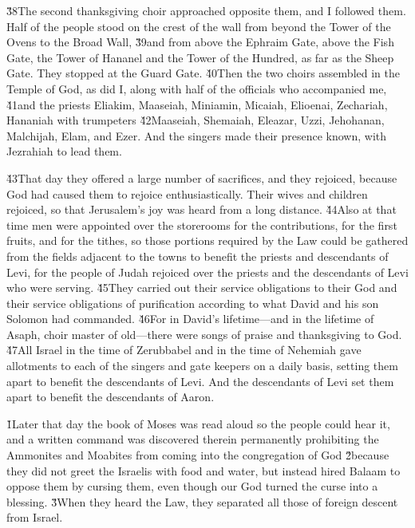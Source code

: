 \v{38}The second thanksgiving choir approached opposite them, and I followed them. Half of the people stood on the crest of the wall from beyond the Tower of the Ovens to the Broad Wall, \v{39}and from above the Ephraim Gate, above the Fish Gate, the Tower of Hananel and the Tower of the Hundred, as far as the Sheep Gate. They stopped at the Guard Gate. \v{40}Then the two choirs assembled in the Temple of God, as did I, along with half of the officials who accompanied me, \v{41}and the priests Eliakim, Maaseiah, Miniamin, Micaiah, Elioenai, Zechariah, Hananiah with trumpeters \v{42}Maaseiah, Shemaiah, Eleazar, Uzzi, Jehohanan, Malchijah, Elam, and Ezer. And the singers made their presence known, with Jezrahiah to lead them.

\v{43}That day they offered a large number of sacrifices, and they rejoiced, because God had caused them to rejoice enthusiastically. Their wives and children rejoiced, so that Jerusalem's joy was heard from a long distance. \v{44}Also at that time men were appointed over the storerooms for the contributions, for the first fruits, and for the tithes, so those portions required by the Law could be gathered from the fields adjacent to the towns to benefit the priests and descendants of Levi, for the people of Judah rejoiced over the priests and the descendants of Levi who were serving. \v{45}They carried out their service obligations to their God and their service obligations of purification according to what David and his son Solomon had commanded. \v{46}For in David's lifetime---and in the lifetime of Asaph, choir master of old---there were songs of praise and thanksgiving to God. \v{47}All Israel in the time of Zerubbabel and in the time of Nehemiah gave allotments to each of the singers and gate keepers on a daily basis, setting them apart to benefit the descendants of Levi. And the descendants of Levi set them apart to benefit the descendants of Aaron.

\v{1}Later that day the book of Moses was read aloud so the people could hear it, and a written command was discovered therein permanently prohibiting the Ammonites and Moabites from coming into the congregation of God \v{2}because they did not greet the Israelis with food and water, but instead hired Balaam to oppose them by cursing them, even though our God turned the curse into a blessing. \v{3}When they heard the Law, they separated all those of foreign descent from Israel.

